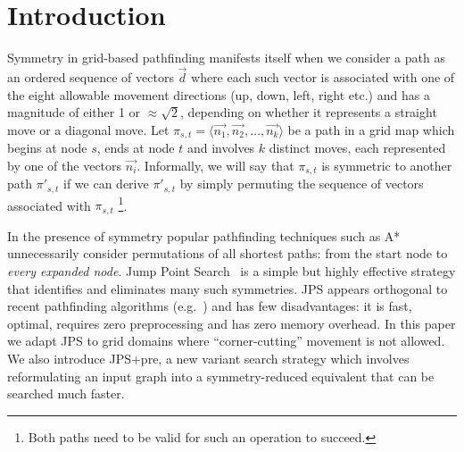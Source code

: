 \section{Introduction}
\label{sec:introduction}
Symmetry in grid-based pathfinding manifests itself when we consider a path as an ordered 
sequence of vectors $\vec{d}$ where each such vector
is associated with one of the eight allowable movement directions (up, down, left, right etc.)
and has a magnitude of either 1 or $\approx\sqrt 2$, depending on whether 
it represents a straight move or a diagonal move.
Let $\pi_{s,t} = \langle \vec{n_1}, \vec{n_2}, \ldots, \vec{n_k} \rangle$ be a path in a grid
map which begins at node $s$, ends at node $t$ and involves $k$ distinct moves, each represented
by one of the vectors $\vec{n_i}$.
Informally, we will say that $\pi_{s,t}$ is symmetric to another path $\pi'_{s,t}$ if we can 
derive $\pi'_{s,t}$ by simply permuting the sequence of vectors associated with $\pi_{s,t}$
\footnote{Both paths need to be valid for such an operation to succeed.}.

In the presence of symmetry popular pathfinding techniques such as 
A*~\cite{hart68} unnecessarily consider permutations 
of all shortest paths: from the start node to 
\emph{every expanded node}.
Jump Point Search~\cite{harabor11b} is a simple but highly effective strategy that
identifies and eliminates many such symmetries. 
JPS appears orthogonal to recent pathfinding algorithms 
(e.g.~\cite{bjornsson06,pochter09,goldenberg10}) and has few disadvantages:
it is fast, optimal, requires zero preprocessing and has zero memory overhead.
In this paper we adapt JPS to grid domains where ``corner-cutting'' movement is not allowed.
We also introduce JPS+pre, a new variant search strategy which involves
reformulating an input graph into a symmetry-reduced equivalent that can be 
searched much faster.
